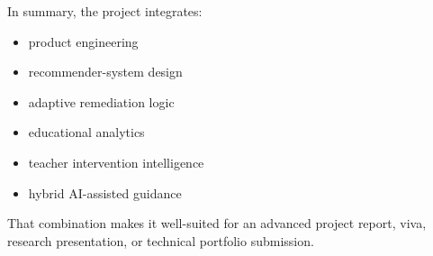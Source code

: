 \documentclass[10pt,twocolumn,a4paper]{article}
\begin{document}
In summary, the project integrates:
\begin{itemize}
  \item product engineering
  \item recommender-system design
  \item adaptive remediation logic
  \item educational analytics
  \item teacher intervention intelligence
  \item hybrid AI-assisted guidance
\end{itemize}

That combination makes it well-suited for an advanced project report, viva, research presentation, or technical portfolio submission.
\end{document}
